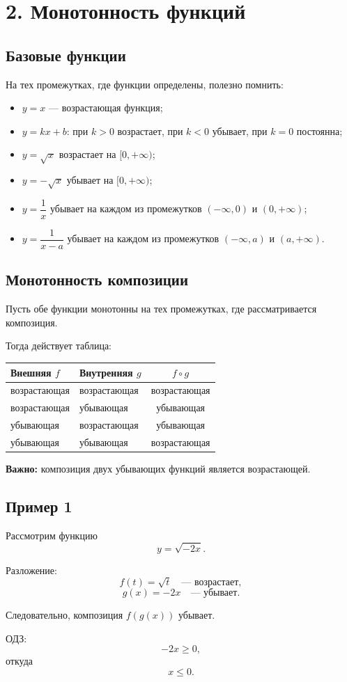 \documentclass[a4paper,12pt]{article}
\newcommand{\sect}[1]{\section*{\textcolor{darkaccent}{#1}}}
\newcommand{\subsect}[1]{\subsection*{\textcolor{accent}{#1}}}
\newcommand{\key}[1]{\textbf{\textcolor{darkaccent}{#1}}}
\begin{document}
\clearpage

\sect{2. Монотонность функций}

\subsect{Базовые функции}

На тех промежутках, где функции определены, полезно помнить:

\begin{itemize}
  \item $y=x$ --- возрастающая функция;
  \item $y=kx+b$: при $k>0$ возрастает, при $k<0$ убывает, при $k=0$ постоянна;
  \item $y=\sqrt{x}$ возрастает на $[0,+\infty)$;
  \item $y=-\sqrt{x}$ убывает на $[0,+\infty)$;
  \item $y=\dfrac1x$ убывает на каждом из промежутков
  $(-\infty,0)$ и $(0,+\infty)$;
  \item $y=\dfrac1{x-a}$ убывает на каждом из промежутков
  $(-\infty,a)$ и $(a,+\infty)$.
\end{itemize}

\subsect{Монотонность композиции}

Пусть обе функции монотонны на тех промежутках, где рассматривается композиция.

Тогда действует таблица:

\begin{center}
\begin{tabularx}{0.86\linewidth}{@{}XXc@{}}
\toprule
Внешняя $f$ & Внутренняя $g$ & $f\circ g$ \\
\midrule
возрастающая & возрастающая & возрастающая \\
возрастающая & убывающая & убывающая \\
убывающая & возрастающая & убывающая \\
убывающая & убывающая & возрастающая \\
\bottomrule
\end{tabularx}
\end{center}

\key{Важно:} композиция двух убывающих функций является возрастающей.

\subsect{Пример 1}

Рассмотрим функцию
\[
y=\sqrt{-2x}.
\]

Разложение:
\[
f(t)=\sqrt{t}
\quad\text{--- возрастает},
\]
\[
g(x)=-2x
\quad\text{--- убывает}.
\]

Следовательно, композиция $f(g(x))$ убывает.

ОДЗ:
\[
-2x\ge0,
\]
откуда
\[
x\le0.
\]
\end{document}
